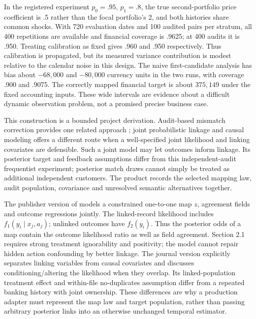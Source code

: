 In the registered experiment $p_0=.95$, $p_1=.8$, the true second-portfolio
price coefficient is .5 rather than the focal portfolio's 2, and both
histories share common shocks. With 720 evaluation dates and 100 audited
pairs per stratum, all 400 repetitions are available and financial coverage
is .9625; at 400 audits it is .950. Treating calibration as fixed gives
.960 and .950 respectively. Thus calibration is propagated, but its measured
variance contribution is modest relative to the calendar noise in this
design. The naive first-candidate analysis has bias about $-68{,}000$ and
$-80{,}000$ currency units in the two runs, with coverage .900 and .9075.
The correctly mapped financial target is about $375{,}149$ under the fixed
accounting inputs. These wide intervals are evidence about a difficult
dynamic observation problem, not a promised precise business case.

This construction is a bounded project derivation. Audit-based mismatch
correction provides one related approach \citep{slawski2025}; joint
probabilistic linkage and causal modeling offers a different route
\citep{guha2022} when a
well-specified joint likelihood and linking covariates are defensible. Such
a joint model may let outcomes inform linkage. Its posterior target and
feedback assumptions differ from this independent-audit frequentist
experiment; posterior match draws cannot simply be treated as additional
independent customers. The product records the selected mapping law, audit
population, covariance and unresolved semantic alternatives together.


The publisher version of \citet[Section 2.3, equation (2.4)]{guha2022}
models a constrained one-to-one map $z$, agreement fields and outcome
regressions jointly. The linked-record likelihood includes
$f_1(y_i\mid x_j,a_j)$; unlinked outcomes have $f_2(y_i)$. Thus the
posterior odds of a map contain the outcome likelihood ratio as well as
field agreement. Section 2.1 requires strong treatment ignorability and
positivity; the model cannot repair hidden action confounding by better
linkage. The journal version explicitly separates linking variables from
causal covariates and discusses conditioning/altering the likelihood when
they overlap. Its linked-population treatment effect and within-file
no-duplicates assumption differ from a repeated banking history with
joint ownership. These differences are why a production adapter must
represent the map law and target population, rather than passing arbitrary
posterior links into an otherwise unchanged temporal estimator.
